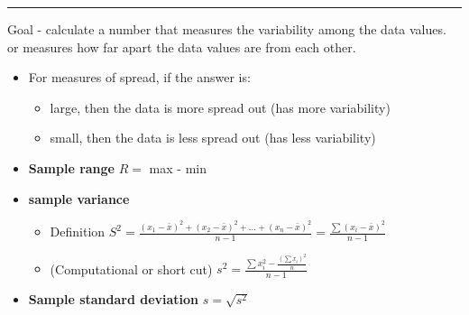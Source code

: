 \documentclass{report}
\begin{document}
\bigbreak \noindent \bigbreak \noindent
{}
\bigbreak \noindent \bigbreak \noindent
\hrule
\bigbreak \noindent
{}
\bigbreak \noindent
Goal - calculate a number that measures the variability among the data values. or measures how far apart the data values are from each other.
\bigbreak \noindent
\begin{itemize}
  \item For measures of spread, if the answer is:
  \begin{itemize}
  \item large, then the data is more spread out (has more variability) 
  \item small, then the data is less spread out (has less variability)
  \end{itemize}
\end{itemize}
\bigbreak \noindent
\begin{itemize}
  \item \textbf{Sample range} \hspace{10mm} $ R = $ max - min 
    \vspace{2mm}

  \item \textbf{sample variance}
  \begin{itemize}
  \item Definition \hspace{10mm} $S^2 = \frac{(x_1 - \bar{x})^2 + (x_2 - \bar{x})^2 + \ldots + (x_n - \bar{x})^2}{n-1} = \frac{\sum(x_i -\bar{x})^2}{n-1}$
    \vspace{2mm}

  \item (Computational or short cut) \hspace{10mm} $s^2=\frac{\sum x_i^2-\frac{\left(\sum x_i\right)^2}{n}}{n-1}$
  \end{itemize}
  \vspace{3mm}

\item \textbf{Sample standard deviation} \hspace{10mm} $s = \sqrt{s^2}$
\end{itemize}
\end{document}
